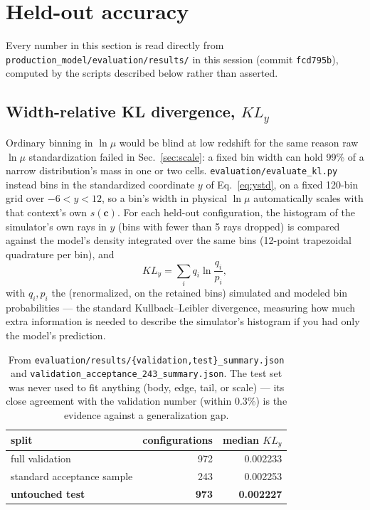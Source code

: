 \documentclass[11pt]{article}
\newcommand{\code}[1]{\texttt{#1}}
\newcommand{\file}[1]{\texttt{#1}}
\newcommand{\vect}[1]{\boldsymbol{#1}}
\begin{document}
\section{Held-out accuracy}
\label{sec:results}

Every number in this section is read directly from
\file{production\_model/evaluation/results/} in this session
(commit \code{fcd795b}), computed by the scripts described below rather
than asserted.

\subsection{Width-relative KL divergence, $KL_y$}

Ordinary binning in $\ln\mu$ would be blind at low redshift for the same
reason raw $\ln\mu$ standardization failed in Sec.~\ref{sec:scale}: a fixed
bin width can hold 99\% of a narrow distribution's mass in one or two
cells. \file{evaluation/evaluate\_kl.py} instead bins in the standardized
coordinate $y$ of Eq.~\ref{eq:ystd}, on a fixed 120-bin grid over
$-6<y<12$, so a bin's width in physical $\ln\mu$ automatically scales with
that context's own $s(\vect c)$. For each held-out configuration, the
histogram of the simulator's own rays in $y$ (bins with fewer than 5 rays
dropped) is compared against the model's density integrated over the same
bins (12-point trapezoidal quadrature per bin), and
\begin{equation}
 KL_y = \sum_i q_i \ln\frac{q_i}{p_i},
 \label{eq:kly}
\end{equation}
with $q_i,p_i$ the (renormalized, on the retained bins) simulated and
modeled bin probabilities — the standard Kullback–Leibler divergence,
measuring how much extra information is needed to describe the simulator's
histogram if you had only the model's prediction.

\begin{table}[h]
\centering
\begin{tabular}{lrr}
\toprule
split & configurations & median $KL_y$ \\
\midrule
full validation & 972 & 0.002233 \\
standard acceptance sample & 243 & 0.002253 \\
\textbf{untouched test} & \textbf{973} & \textbf{0.002227} \\
\bottomrule
\end{tabular}
\caption{From \file{evaluation/results/\{validation,test\}\_summary.json}
and \code{validation\_acceptance\_243\_summary.json}. The test set was never
used to fit anything (body, edge, tail, or scale) — its close agreement
with the validation number (within 0.3\%) is the evidence against a
generalization gap.}
\end{table}
\end{document}
